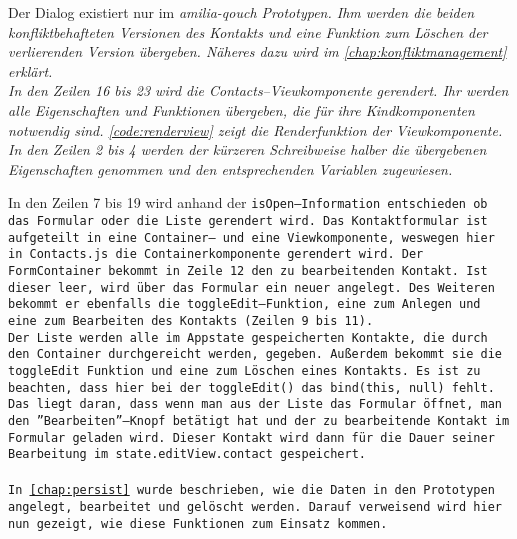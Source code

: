 Der Dialog existiert nur im \it{amilia-qouch} Prototypen.
Ihm werden die beiden konfliktbehafteten Versionen des Kontakts und eine Funktion zum Löschen der verlierenden Version übergeben. 
Näheres dazu wird im \autoref{chap:konfliktmanagement} erklärt.\\
%
In den Zeilen 16 bis 23 wird die Contacts--Viewkomponente gerendert.
Ihr werden alle Eigenschaften und Funktionen übergeben, die für ihre Kindkomponenten notwendig sind.
\autoref{code:renderview} zeigt die Renderfunktion der Viewkomponente.\\
In den Zeilen 2 bis 4 werden der kürzeren Schreibweise halber die übergebenen Eigenschaften genommen und den entsprechenden Variablen zugewiesen.
% 
%
\begin{center}
  
\end{center}
%
% 
In den Zeilen 7 bis 19 wird anhand der \tt{isOpen}--Information entschieden ob das Formular oder die Liste gerendert wird.
%
Das Kontaktformular ist aufgeteilt in eine Container-- und eine Viewkomponente, weswegen hier in \tt{Contacts.js} die Containerkomponente gerendert wird.
Der \tt{FormContainer} bekommt in Zeile 12 den zu bearbeitenden Kontakt.
Ist dieser leer, wird über das Formular ein neuer angelegt.
Des Weiteren bekommt er ebenfalls die \tt{toggleEdit}--Funktion, eine zum Anlegen und eine zum Bearbeiten des Kontakts (Zeilen 9 bis 11).\\
%
Der Liste werden alle im \gls{App}state gespeicherten Kontakte, die durch den Container durchgereicht werden, gegeben.
Außerdem bekommt sie die \tt{toggleEdit} Funktion und eine zum Löschen eines Kontakts.
Es ist zu beachten, dass hier bei der \tt{toggleEdit()} das \tt{bind(this, null)} fehlt. Das liegt daran, dass wenn man aus der Liste das Formular öffnet, man den ''Bearbeiten''--Knopf betätigt hat und der zu bearbeitende Kontakt im Formular geladen wird.
Dieser Kontakt wird dann für die Dauer seiner Bearbeitung im \tt{state.editView.contact} gespeichert.\\\\
%
%
In \autoref{chap:persist} wurde beschrieben, wie die Daten in den Prototypen angelegt, bearbeitet und gelöscht werden. Darauf verweisend wird hier nun gezeigt, wie diese Funktionen zum Einsatz kommen.